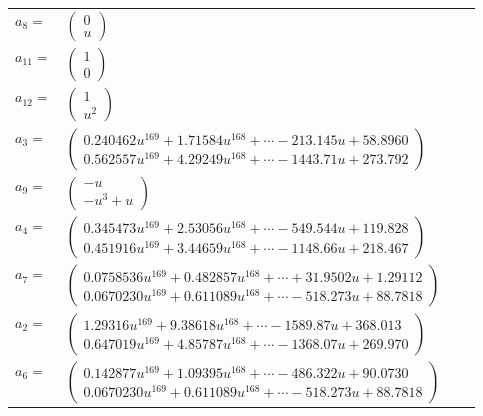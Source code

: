 \documentclass[1p]{elsarticle_modified}
\theoremstyle{definition}
\begin{document}
\begin{tabular}{m{7pt} m{180pt} m{7pt} m{180pt} }
\flushright $a_{8}=$&$\begin{pmatrix}0\\u\end{pmatrix}$ \\
\flushright $a_{11}=$&$\begin{pmatrix}1\\0\end{pmatrix}$ \\
\flushright $a_{12}=$&$\begin{pmatrix}1\\u^2\end{pmatrix}$ \\
\flushright $a_{3}=$&$\begin{pmatrix}0.240462 u^{169}+1.71584 u^{168}+\cdots-213.145 u+58.8960\\0.562557 u^{169}+4.29249 u^{168}+\cdots-1443.71 u+273.792\end{pmatrix}$ \\
\flushright $a_{9}=$&$\begin{pmatrix}- u\\- u^3+u\end{pmatrix}$ \\
\flushright $a_{4}=$&$\begin{pmatrix}0.345473 u^{169}+2.53056 u^{168}+\cdots-549.544 u+119.828\\0.451916 u^{169}+3.44659 u^{168}+\cdots-1148.66 u+218.467\end{pmatrix}$ \\
\flushright $a_{7}=$&$\begin{pmatrix}0.0758536 u^{169}+0.482857 u^{168}+\cdots+31.9502 u+1.29112\\0.0670230 u^{169}+0.611089 u^{168}+\cdots-518.273 u+88.7818\end{pmatrix}$ \\
\flushright $a_{2}=$&$\begin{pmatrix}1.29316 u^{169}+9.38618 u^{168}+\cdots-1589.87 u+368.013\\0.647019 u^{169}+4.85787 u^{168}+\cdots-1368.07 u+269.970\end{pmatrix}$ \\
\flushright $a_{6}=$&$\begin{pmatrix}0.142877 u^{169}+1.09395 u^{168}+\cdots-486.322 u+90.0730\\0.0670230 u^{169}+0.611089 u^{168}+\cdots-518.273 u+88.7818\end{pmatrix}$ \\

\end{tabular}
\end{document}
